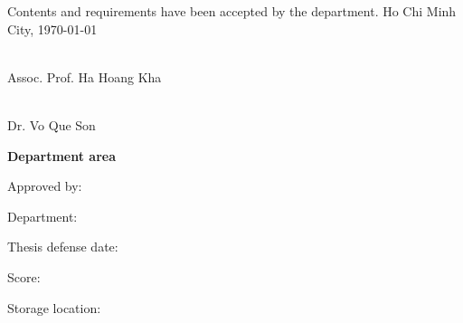\documentclass[\main/thesis.tex]{subfiles}
\begin{document}
Contents and requirements have been accepted by the department.
\newline\newline
Ho Chi Minh City, \today

\vspace{10mm}

\begin{minipage}{0.45\textwidth}

    \begin{center}
        \textbf{\fontsize{14}{12}\selectfont{
            HEAD OF DEPARTMENT}}\\
            \vspace{2cm}
            Assoc. Prof. Ha Hoang Kha
    \end{center}
\end{minipage}
\hfill
\begin{minipage}{0.45\textwidth}
    \begin{center}
        \textbf{\fontsize{14}{12}\selectfont{SUPERVISOR}} \\
        \vspace{2cm}
        Dr. Vo Que Son
    \end{center}
\end{minipage}

\newpage

\textbf{Department area}

Approved by:

Department:

Thesis defense date:

Score:

Storage location:
\end{document}
